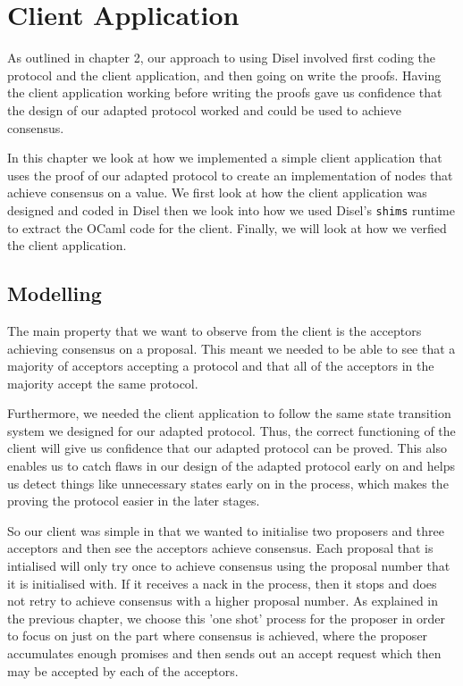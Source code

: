 \chapter{Client Application}
As outlined in chapter 2, our approach to using Disel involved first coding
the protocol and the client application, and then going on write the proofs.
Having the client application working before writing the proofs gave us
confidence that the design of our adapted protocol worked and could be used
to achieve consensus.

In this chapter we look at how we implemented a simple client application
that uses the proof of our adapted protocol to create an implementation of nodes
that achieve consensus on a value. We first look at how the client application was
designed and coded in Disel then we look into how we used Disel's \texttt{shims}
runtime to extract the OCaml code for the client. Finally, we will look at how
we verfied the client application.

\section{Modelling}

The main property that we want to observe from the client is the acceptors achieving
consensus on a proposal. This meant we needed to be able to see that a majority of
acceptors accepting a protocol and that all of the acceptors in the majority
accept the same protocol.

Furthermore, we needed the client application to follow the same state transition
system we designed for our adapted protocol. Thus, the correct functioning of the
client will give us confidence that our adapted protocol can be proved. This also
enables us to catch flaws in our design of the adapted protocol early on and helps
us detect things like unnecessary states early on in the process, which makes the
proving the protocol easier in the later stages.

So our client was simple in that we wanted to initialise two proposers and three
acceptors and then see the acceptors achieve consensus. Each proposal that is intialised
will only try once to achieve consensus using the proposal number that it is initialised
with. If it receives a nack in the process, then it stops and does not retry to
achieve consensus with a higher proposal number. As explained in the previous
chapter, we choose this 'one shot' process for the proposer in order to focus on
just on the part where consensus is achieved, where the proposer accumulates
enough promises and then sends out an accept request which then may be accepted
by each of the acceptors.

